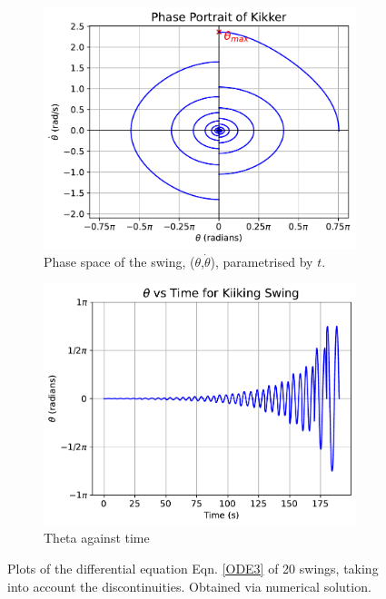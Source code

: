 \documentclass[12pt]{article}
\begin{document}
\begin{figure}[ht]
    \centering
    \begin{subfigure}[b]{0.49\textwidth}
        \centering
        \includegraphics[width=\textwidth]{Figures/phase_plot.pdf}
        \caption{Phase space of the swing, ($\theta$,$\dot{\theta}$), parametrised by $t$.}
        \label{fig:phase_space}
    \end{subfigure}
    \hfill
    \begin{subfigure}[b]{0.49\textwidth}
        \centering
        \includegraphics[width=\textwidth]{Figures/thetatimeplot.pdf}
        \caption{Theta against time}
        \label{fig:theta_time}
    \end{subfigure}
    \caption{Plots of the differential equation Eqn. \ref{ODE3} of 20 swings, taking into account the discontinuities. Obtained via numerical solution.}
\end{figure}
\end{document}
